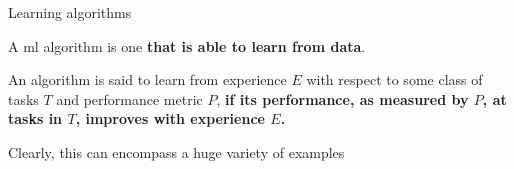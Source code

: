 
\begin{frame}[t]{Learning algorithms}


    A \gls{ml} algorithm 
    is one {\bf that is able to learn from data}.\\
    \vspace{0.2cm}

    An algorithm is said to learn from experience $E$ with respect to
    some class of tasks $T$ and performance metric $P$, 
    {\bf if its performance, as measured by $P$, at tasks in $T$,
    improves with experience $E$.}\\ 
    \vspace{0.2cm}

    Clearly, this can encompass a huge variety of examples\\

\end{frame}